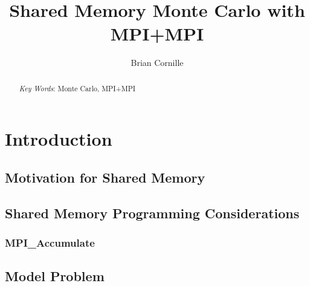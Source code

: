 \documentclass{mc2015}
\begin{document}
\title{Shared Memory Monte Carlo with MPI+MPI}

\author{Brian Cornille}


\maketitle

\begin{abstract}



\emph{Key Words}: Monte Carlo, MPI+MPI
\end{abstract}

\section{Introduction}



\subsection{Motivation for Shared Memory}



\subsection{Shared Memory Programming Considerations}



\subsubsection{MPI\_Accumulate}



\subsection{Model Problem}
\end{document}
